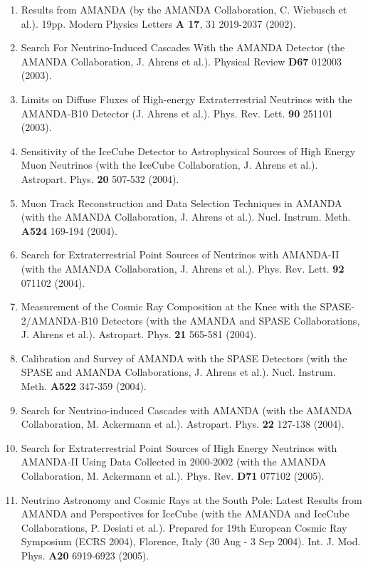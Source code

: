 \begin{enumerate}
\item Results from AMANDA (by the AMANDA Collaboration, C. Wiebusch et al.).  19pp.  Modern Physics Letters {\bf A 17}, 31 2019-2037 (2002).

\item Search For Neutrino-Induced Cascades With the AMANDA Detector (the AMANDA Collaboration, J. Ahrens et al.).  Physical Review {\bf D67} 012003 (2003).

\item Limits on Diffuse Fluxes of High-energy Extraterrestrial Neutrinos with the AMANDA-B10 Detector (J. Ahrens et al.).  Phys. Rev. Lett. {\bf 90} 251101 (2003).

\item Sensitivity of the IceCube Detector to Astrophysical Sources of High Energy Muon Neutrinos (with the IceCube Collaboration, J. Ahrens et al.).  Astropart. Phys. {\bf 20} 507-532 (2004).

\item Muon Track Reconstruction and Data Selection Techniques in AMANDA (with the AMANDA Collaboration, J. Ahrens et al.).  Nucl. Instrum. Meth. {\bf A524} 169-194 (2004).

\item Search for Extraterrestrial Point Sources of Neutrinos with AMANDA-II (with the AMANDA Collaboration, J. Ahrens et al.).  Phys. Rev. Lett. {\bf 92} 071102 (2004). 

\item Measurement of the Cosmic Ray Composition at the Knee with the SPASE-2/AMANDA-B10 Detectors (with the AMANDA and SPASE Collaborations, J. Ahrens et al.).  Astropart. Phys. {\bf 21} 565-581 (2004).

\item Calibration and Survey of AMANDA with the SPASE Detectors (with the SPASE and AMANDA Collaborations, J. Ahrens et al.).  Nucl. Instrum. Meth. {\bf A522} 347-359 (2004).

\item Search for Neutrino-induced Cascades with AMANDA (with the AMANDA Collaboration, M. Ackermann et al.).  Astropart. Phys. {\bf 22} 127-138 (2004).

\item Search for Extraterrestrial Point Sources of High Energy Neutrinos with AMANDA-II Using Data Collected in 2000-2002 (with the AMANDA Collaboration, M. Ackermann et al.).  Phys. Rev. {\bf D71} 077102 (2005). 

\item Neutrino Astronomy and Cosmic Rays at the South Pole: Latest Results from AMANDA and Perspectives for IceCube (with the AMANDA and IceCube Collaborations, P. Desiati et al.).  Prepared for 19th European Cosmic Ray Symposium (ECRS 2004), Florence, Italy (30 Aug - 3 Sep 2004).  Int. J. Mod. Phys. {\bf A20} 6919-6923 (2005).


\end{enumerate}
